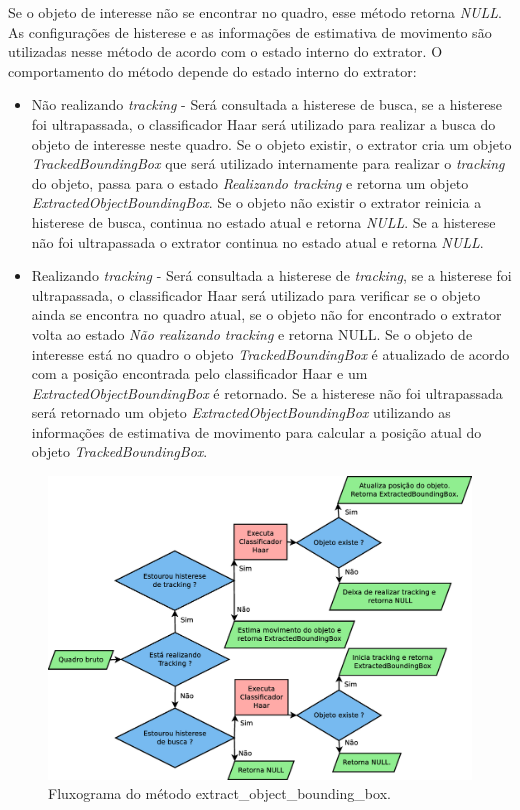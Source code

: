 Se o objeto de interesse não se encontrar no quadro, esse método retorna \textit{NULL}. As configurações de histerese e as informações de estimativa de movimento são utilizadas nesse método de acordo com o estado interno do extrator. O comportamento do método depende do estado interno do extrator:

\begin{itemize}

	\item Não realizando \textit{tracking} - Será consultada a histerese de busca, se a histerese foi ultrapassada, o classificador Haar será utilizado para realizar a busca do objeto de interesse neste quadro. Se o objeto existir, o extrator cria um objeto \textit{TrackedBoundingBox} que será utilizado internamente para realizar o \textit{tracking} do objeto, passa para o estado \textit{Realizando tracking} e retorna um objeto \textit{ExtractedObjectBoundingBox}. Se o objeto não existir o extrator reinicia a histerese de busca, continua no estado atual e retorna \textit{NULL}. Se a histerese não foi ultrapassada o extrator continua no estado atual e retorna \textit{NULL}.

	\item Realizando \textit{tracking} - Será consultada a histerese de \textit{tracking}, se a histerese foi ultrapassada, o classificador Haar será utilizado para verificar se o objeto ainda se encontra no quadro atual, se o objeto não for encontrado o extrator volta ao estado \textit{Não realizando tracking} e retorna NULL. Se o objeto de interesse está no quadro o objeto \textit{TrackedBoundingBox} é atualizado de acordo com a posição encontrada pelo classificador Haar e um \textit{ExtractedObjectBoundingBox} é retornado. Se a histerese não foi ultrapassada será retornado um objeto \textit{ExtractedObjectBoundingBox} utilizando as informações de estimativa de movimento para calcular a posição atual do objeto \textit{TrackedBoundingBox}.

\end{itemize}


\begin{figure}[H]
\centering
\includegraphics[scale=0.38]{imagens/fig14.eps}
\caption{Fluxograma do método extract\_object\_bounding\_box.}
\label{fig:extract_bounding_box_fluxogram}
\end{figure}

